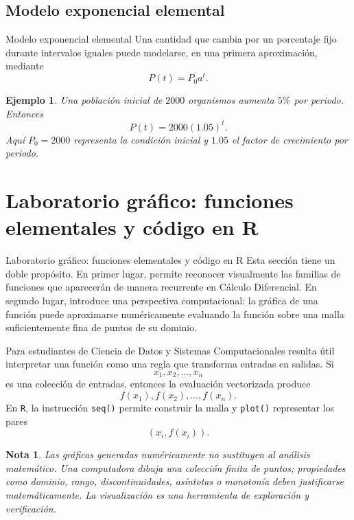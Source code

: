 \documentclass[aspectratio=169,10pt]{beamer}
\newtheorem{ejemplo}{Ejemplo}
\newtheorem{nota}{Nota}
\begin{document}
\subsection{Modelo exponencial elemental}
\begin{frame}{Modelo exponencial elemental}
Una cantidad que cambia por un porcentaje fijo durante intervalos iguales puede
modelarse, en una primera aproximación, mediante
\[
P(t)=P_0a^t.
\]

\begin{ejemplo}
Una población inicial de $2000$ organismos aumenta $5\%$ por periodo. Entonces
\[
P(t)=2000(1.05)^t.
\]
Aquí $P_0=2000$ representa la condición inicial y $1.05$ el factor de
crecimiento por periodo.
\end{ejemplo}


\end{frame}
\section{Laboratorio gráfico: funciones elementales y código en R}
\begin{frame}{Laboratorio gráfico: funciones elementales y código en R}
Esta sección tiene un doble propósito. En primer lugar, permite reconocer
visualmente las familias de funciones que aparecerán de manera recurrente en
Cálculo Diferencial. En segundo lugar, introduce una perspectiva computacional:
la gráfica de una función puede aproximarse numéricamente evaluando la función
sobre una malla suficientemente fina de puntos de su dominio.

Para estudiantes de Ciencia de Datos y Sistemas Computacionales resulta útil
interpretar una función como una regla que transforma entradas en salidas. Si
\[
x_1,x_2,\ldots,x_n
\]
es una colección de entradas, entonces la evaluación vectorizada produce
\[
f(x_1),f(x_2),\ldots,f(x_n).
\]
En \texttt{R}, la instrucción \texttt{seq()} permite construir la malla y
\texttt{plot()} representar los pares
\[
(x_i,f(x_i)).
\]

\begin{nota}
Las gráficas generadas numéricamente no sustituyen al análisis matemático.
Una computadora dibuja una colección finita de puntos; propiedades como
dominio, rango, discontinuidades, asíntotas o monotonía deben justificarse
matemáticamente. La visualización es una herramienta de exploración y
verificación.
\end{nota}
\end{frame}
\end{document}
